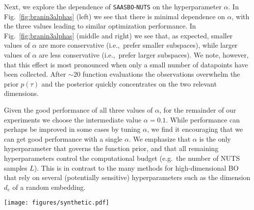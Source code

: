 \documentclass[accepted]{uai2021} %
\newcommand{\algoname}{{\texttt {SAASBO}}}
\begin{document}
Next, we explore the dependence of \algoname-\texttt{NUTS} on the hyperparameter $\alpha$.
In Fig.~\ref{fig:branin3alphas} (left) we see that there is
minimal dependence on $\alpha$, with the three values leading to similar optimization performance.
In Fig.~\ref{fig:branin3alphas} (middle and right) we see that, as expected, smaller values of
$\alpha$ are more conservative (i.e.,~prefer smaller subspaces), while larger values of $\alpha$
are less conservative (i.e.,~prefer larger subspaces). We note, however, that this effect is most pronounced
when only a small number of datapoints have been collected. After $\sim 20$ function evaluations
the observations overwhelm the prior $p(\tau)$ and the posterior quickly concentrates on the two relevant dimensions.

Given the good performance of all three values of $\alpha$, for the remainder of our experiments we
choose the intermediate value $\alpha=0.1$.
While performance can perhaps be improved
in some cases by tuning $\alpha$, we find it encouraging that we can get good performance with
a single $\alpha$. We emphasize that $\alpha$ is the only hyperparameter that governs the function prior, and that all remaining hyperparameters
control the computational budget (e.g.~the number of NUTS samples $L$).
This is in contrast to the many methods for high-dimensional BO that rely on several (potentially sensitive)
hyperparameters such as the dimension $d_e$ of a random embedding.

\begin{figure*}[!ht]
    \centering
    \texttt{[image: figures/synthetic.pdf]}
      \caption{We compare \algoname{} to seven baseline methods on three $d-$dimensional functions embedded
      in $D=100$ dimensions. In each case we do $30$ independent replications.
      {\bf Top row:} For each method we depict the mean value of the best minimum found at a given iteration.
      {\bf Bottom row:} For each method we depict the distribution over the final approximate minimum $y_{\rm min}$ encoded as
      a violin plot, with horizontal bars corresponding to $5$\%, $50$\%, and $95$\% quantiles.
      }
    \label{fig:synthetic}
  \end{figure*}
\end{document}
